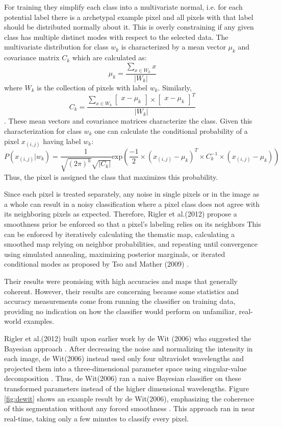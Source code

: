 \documentclass[twoside]{report}
\begin{document}
For training they simplify each class into a multivariate normal, i.e. for each potential label there is a archetypal example pixel and all pixels with that label should be distributed normally about it. This is overly constraining if any given class has multiple distinct modes with respect to the selected data. The multivariate distribution for class $w_k$ is characterized by a mean vector $\mu_k$ and covariance matrix $C_k$ which are calculated as:
\[ \mu_k = \frac{\sum_{x \in W_k} x}{|W_k|} \]
where $W_k$ is the collection of pixels with label $w_k$. Similarly,
\[ C_k = \frac{\sum_{x \in W_k} \begin{bmatrix} x - \mu_k \end{bmatrix} \times \begin{bmatrix} x - \mu_k \end{bmatrix}^T}{|W_k|} \].
These mean vectors and covariance matrices characterize the class. Given this characterization for class $w_k$ one can calculate the conditional probability of a pixel $x_{(i,j)}$ having label $w_k$:
\[ P(x_{(i,j)} | w_k) = \frac{1}{\sqrt{(2 \pi)^h} \sqrt{|C_k|}} \mathrm{exp} \left( \frac{-1}{2} \times \left(x_{(i,j)} - \mu_k \right)^T \times C_k^{-1} \times \left(x_{(i,j)} - \mu_k \right) \right) \]
Thus, the pixel is assigned the class that maximizes this probability.

Since each pixel is treated separately, any noise in single pixels or in the image as a whole can result in a noisy classification where a pixel class does not agree with its neighboring pixels as expected. Therefore, Rigler et al.(2012) propose a smoothness prior be enforced so that a pixel's labeling relies on its neighbors This can be enforced by iteratively calculating the thematic map, calculating a smoothed map relying on neighbor probabilities, and repeating until convergence using simulated annealing, maximizing posterior marginals, or iterated conditional modes as proposed by Tso and Mather (2009) \cite{tso:2009}. 

Their results were promising with high accuracies and maps that generally coherent. However, their results are concerning because some statistics and accuracy measurements come from running the classifier on training data, providing no indication on how the classifier would perform on unfamiliar, real-world examples. 

Rigler et al.(2012) built upon earlier work by de Wit (2006) who suggested the Bayesian approach \cite{dewit:2006}. After decreasing the noise and normalizing the intensity in each image, de Wit(2006) instead used only four ultraviolet wavelengths and projected them into a three-dimensional parameter space using singular-value decomposition \cite{dewit:2006}. Thus, de Wit(2006) ran a naive Bayesian classifier on these transformed parameters instead of the higher dimensional wavelengths. Figure \ref{fig:dewit} shows an example result by de Wit(2006), emphasizing the coherence of this segmentation without any forced smoothness \cite{dewit:2006}. This approach ran in near real-time, taking only a few minutes to classify every pixel. 
\end{document}
